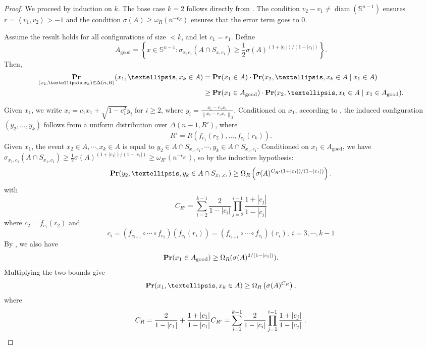 \documentclass[10pt,a4paper]{amsart}
\renewcommand{\Pr}{\mathop{\bf Pr\/}}
\newcommand{\inner}[1]{\left\langle{#1}\right\rangle}
\newcommand{\norm}[1]{\left\lVert#1\right\rVert}
\newcommand{\sn}{{\mathbb{S}^{n-1} }}
\begin{document}
\begin{proof}
We proceed by induction on \( k \). The base case \( k = 2 \) follows directly from . The condition \( v_2 - v_1 \neq \operatorname{diam}(\sn) \) ensures \( r = \inner{v_1, v_2} > -1 \) and the condition $\sigma(A)\geq \omega_R(n^{-\epsilon_R})$ ensures that the error term goes to $0$.

Assume the result holds for all configurations of size \( < k \), and let \( c_1 = r_1 \). Define
\[
A_{\mathrm{good}} = \left\{x \in \sn : \sigma_{x, c_1}(A \cap S_{x, c_1}) \geq \frac{1}{2} \sigma(A)^{(1 + |c_1|)/(1 - |c_1|)} \right\}.
\]
Then,
\begin{align*}
\Pr_{(x_1, \dots, x_k) \in \Delta(n, R)}(x_1, \dots, x_k \in A)
&= \Pr(x_1 \in A) \cdot \Pr(x_2, \dots, x_k \in A \mid x_1 \in A) \\
&\geq \Pr(x_1 \in A_{\mathrm{good}}) \cdot \Pr(x_2, \dots, x_k \in A \mid x_1 \in A_{\mathrm{good}}).
\end{align*}

Given \( x_1 \), we write \( x_i = c_1 x_1 + \sqrt{1 - c_1^2} y_i \) for \( i \geq 2 \), where \( y_i =\frac{x_i-r_1x_1}{\norm{x_i-r_1x_1}_2} \). Conditioned on $x_1$, according to , the induced configuration \( (y_2, \dots, y_k) \)  follows from a uniform distribution over \( \Delta(n - 1, R') \), where
\[
R' = R(f_{c_1}(r_2), \dots, f_{c_1}(r_k)).
\]
Given $x_1$, the event $x_2\in A,\cdots,x_k\in A$ is equal to $y_2\in A\cap S_{x_1,c_1},\cdots ,y_k\in A\cap S_{x_1,c_1}$. Conditioned on \( x_1 \in A_{\mathrm{good}} \), we have \( \sigma_{x_1, c_1}(A \cap S_{x_1, c_1}) \geq \frac{1}{2} \sigma(A)^{(1 + |c_1|)/(1 - |c_1|)}\geq \omega_{R'}(n^{-\epsilon_{R'}})\), so by the inductive hypothesis:
\[
\Pr(y_2, \dots, y_k \in A \cap S_{x_1, c_1}) \geq \Omega_R\left(\sigma(A)^{C_{R'} (1 + |c_1|)/(1 - |c_1|)}\right).
\]
with
$$C_{R'}=\sum_{i=2}^{k-1}\frac{2}{1-|c_i|}\prod_{j=2}^{i-1} {\frac{1+|c_j|}{1-|c_j|}}$$
where $c_2=f_{c_1}(r_2)$ and
    $$c_{i}=(f_{c_{i-1}}\circ \cdots \circ f_{c_2})(f_{c_1}(r_i))=(f_{c_{i-1}}\circ \cdots \circ f_{c_1})(r_i),\ i=3,\cdots,k-1$$
By , we also have
\[
\Pr(x_1 \in A_{\mathrm{good}}) \geq \Omega_R(\sigma(A)^{2/(1 - |c_1|)}).
\]
Multiplying the two bounds give
\[
\Pr(x_1, \dots, x_k \in A) \geq \Omega_R\left(\sigma(A)^{C_R}\right),
\]
where
\[
C_R = \frac{2}{1 - |c_1|} + \frac{1 + |c_1|}{1 - |c_1|} C_{R'} = \sum_{i = 1}^{k-1} \frac{2}{1 - |c_i|} \prod_{j = 1}^{i-1} \frac{1 + |c_j|}{1 - |c_j|} \ .\qedhere
\]
\end{proof}
\end{document}
